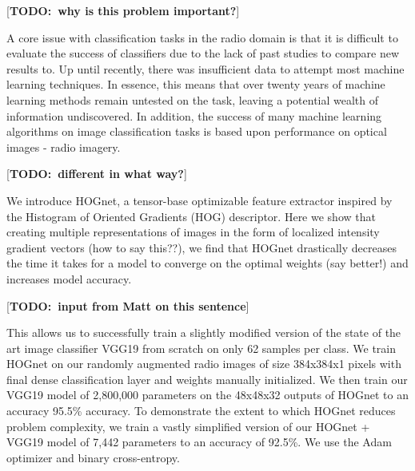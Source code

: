 \documentclass{article}
\newcommand{\todo}[1]{ {\color{red}[{\bf TODO:~{#1}}]}}
\begin{document}
\todo{why is this problem important?}

A core issue with classification tasks in the radio domain is that it is difficult to evaluate the success of classifiers due to the lack of past studies to compare new results to. Up until recently, there was insufficient data to attempt most machine learning techniques. In essence, this means that over twenty years of machine learning methods remain untested on the task, leaving a potential wealth of information undiscovered. In addition, the success of many machine learning algorithms on image classification tasks is based upon performance on optical images - radio imagery.

\todo{different in what way?}

We introduce HOGnet, a tensor-base optimizable feature extractor inspired by the Histogram of Oriented Gradients (HOG) descriptor. Here we show that creating multiple representations of images in the form of localized intensity gradient vectors (how to say this??), we find that HOGnet drastically decreases the time it takes for a model to converge on the optimal weights (say better!) and increases model accuracy. 

\todo{input from Matt on this sentence}

This allows us to successfully train a slightly modified version of the state of the art image classifier VGG19 from scratch on only 62 samples per class. We train HOGnet on our randomly augmented radio images of size 384x384x1 pixels with final dense classification layer and weights manually initialized. We then train our VGG19 model of 2,800,000 parameters on the 48x48x32 outputs of HOGnet to an accuracy 95.5\% accuracy. To demonstrate the extent to which HOGnet reduces problem complexity, we train a vastly simplified version of our HOGnet + VGG19 model of 7,442 parameters to an accuracy of 92.5\%. We use the Adam optimizer and binary cross-entropy. 
\end{document}
